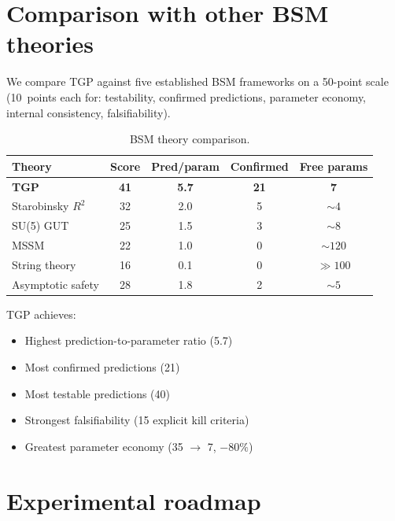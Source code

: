 \documentclass[aps,prd,twocolumn,superscriptaddress,showpacs,
  nofootinbib,floatfix,longbibliography]{revtex4-2}
\begin{document}
\section{Comparison with other BSM theories}\label{sec:comparison}

We compare TGP against five established BSM frameworks on a
50-point scale (10~points each for: testability, confirmed
predictions, parameter economy, internal consistency, falsifiability).

\begin{table}[t]
\caption{BSM theory comparison.}\label{tab:comparison}
\begin{ruledtabular}
\begin{tabular}{lcccc}
Theory & Score & Pred/param & Confirmed & Free params \\
\hline
\textbf{TGP} & \textbf{41} & \textbf{5.7} & \textbf{21} & \textbf{7} \\
Starobinsky $R^2$ & 32 & 2.0 & 5 & $\sim 4$ \\
SU(5) GUT & 25 & 1.5 & 3 & $\sim 8$ \\
MSSM & 22 & 1.0 & 0 & $\sim 120$ \\
String theory & 16 & 0.1 & 0 & $\gg 100$ \\
Asymptotic safety & 28 & 1.8 & 2 & $\sim 5$ \\
\end{tabular}
\end{ruledtabular}
\end{table}

TGP achieves:
\begin{itemize}
\item Highest prediction-to-parameter ratio (5.7)
\item Most confirmed predictions (21)
\item Most testable predictions (40)
\item Strongest falsifiability (15 explicit kill criteria)
\item Greatest parameter economy (35 $\to$ 7, $-80\%$)
\end{itemize}


\section{Experimental roadmap}\label{sec:roadmap}
\end{document}
